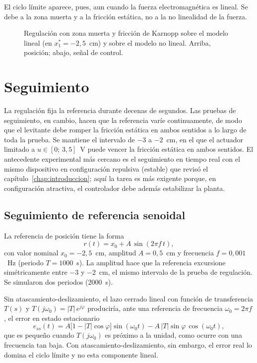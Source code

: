 El ciclo límite aparece, pues, aun cuando la fuerza electromagnética es lineal. Se debe a la zona muerta y a la fricción estática, no a la no linealidad de la fuerza.

\begin{figure}[ht]
    \centering
    
    \caption[Modelo lineal con atascamiento-deslizamiento]{Regulación con zona muerta y fricción de Karnopp sobre el modelo lineal (en $x_1^*=-2{,}5$~cm) y sobre el modelo no lineal. Arriba, posición; abajo, señal de control.}
    \label{fig:p8_lineal_ad}
\end{figure}

\FloatBarrier

\section{Seguimiento}

La regulación fija la referencia durante decenas de segundos. Las pruebas de seguimiento, en cambio, hacen que la referencia varíe continuamente, de modo que el levitante debe romper la fricción estática en ambos sentidos a lo largo de toda la prueba. Se mantiene el intervalo de $-3$ a $-2$~cm, en el que el actuador limitado a $u\in[0;\,3{,}5]$~V puede vencer la fricción estática en ambos sentidos. El antecedente experimental más cercano es el seguimiento en tiempo real con el mismo dispositivo en configuración repulsiva (estable) que revisó el capítulo~\ref{chap:introduccion}; aquí la tarea es más exigente porque, en configuración atractiva, el controlador debe además estabilizar la planta.

\subsection{Seguimiento de referencia senoidal}

La referencia de posición tiene la forma
\begin{equation}
  r(t) = x_0 + A\,\sin(2\pi f\, t) ,
  \label{eq:ref_senoidal}
\end{equation}
con valor nominal $x_0 = -2{,}5$~cm, amplitud $A = 0{,}5$~cm y frecuencia $f = 0{,}001$~Hz (periodo $T = 1000$~s). La amplitud hace que la referencia excursione simétricamente entre $-3$ y $-2$~cm, el mismo intervalo de la prueba de regulación. Se simularon dos periodos (2000~s).

Sin atascamiento-deslizamiento, el lazo cerrado lineal con función de transferencia $T(s)$ y $T(j\omega_0)=|T|\,e^{j\varphi}$ produciría, ante una referencia de frecuencia $\omega_0 = 2\pi f$, el error en estado estacionario
\begin{equation}
  e_{ss}(t) = A\bigl[1 - |T|\cos\varphi\bigr]\sin(\omega_0 t)
              - A\,|T|\sin\varphi\,\cos(\omega_0 t) ,
  \label{eq:ess_senoidal}
\end{equation}
que es pequeño cuando $T(j\omega_0)$ es próximo a la unidad, como ocurre con una frecuencia tan baja. Con atascamiento-deslizamiento, sin embargo, el error real lo domina el ciclo límite y no esta componente lineal.

